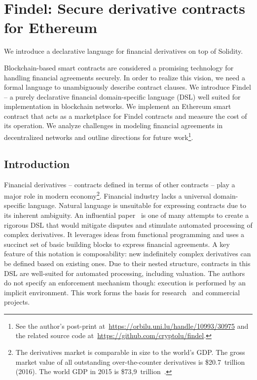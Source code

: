 \chapter{Findel: Secure derivative contracts for Ethereum}

\label{Chapter10Findel}

We introduce a declarative language for financial derivatives on top of Solidity.


Blockchain-based smart contracts are considered a promising technology for handling financial agreements securely.
In order to realize this vision, we need a formal language to unambiguously describe contract clauses.
We introduce Findel -- a purely declarative financial domain-specific language (DSL) well suited for implementation in blockchain networks.
We implement an Ethereum smart contract that acts as a marketplace for Findel contracts and measure the cost of its operation.
We analyze challenges in modeling financial agreements in decentralized networks and outline directions for future work\footnote{See the author's post-print at~\url{https://orbilu.uni.lu/handle/10993/30975} and the related source code at~\url{https://github.com/cryptolu/findel}.}.



\section{Introduction}

Financial derivatives -- contracts defined in terms of other contracts -- play a major role in modern economy\footnote{The derivatives market is comparable in size to the world's GDP. The gross market value of all outstanding over-the-counter derivatives is \$20.7~trillion~\cite{InternationalSettlements2016} (2016). The world GDP in 2015 is \$73,9~trillion~\cite{WorldBank}.}.
Financial industry lacks a universal domain-specific language.
Natural language is unsuitable for expressing contracts due to its inherent ambiguity.
An influential paper~\cite{PeytonJones2000} is one of many attempts to create a rigorous DSL that would mitigate disputes and stimulate automated processing of complex derivatives.
It leverages ideas from functional programming and uses a succinct set of basic building blocks to express financial agreements.
A key feature of this notation is composability: new indefinitely complex derivatives can be defined based on existing ones.
Due to their nested structure, contracts in this DSL are well-suited for automated processing, including valuation.
The authors do not specify an enforcement mechanism though: execution is performed by an implicit environment.
This work forms the basis for research~\cite{Gaillourdet2011, Schuldenzucker2014} and commercial~\cite{Frankau2009} projects.

